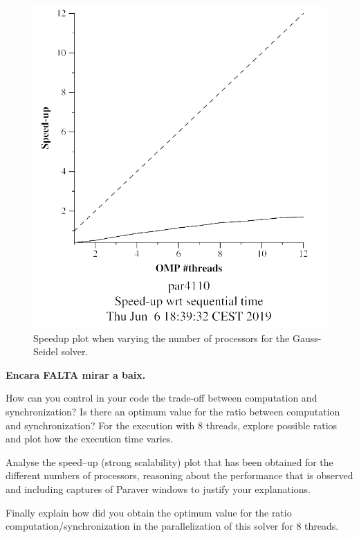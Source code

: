 \documentclass[12pt, a4paper]{article}
\begin{document}
\begin{figure}[H]
\begin{minipage}{0.4\linewidth}
  \includegraphics[scale=0.5]{./images/heat-omp-strong-gauss-speedup}
  \caption{Speedup plot when varying the number of processors for the Gauss-Seidel solver.}
    \label{plot:speed-gauss}
\end{minipage}
\end{figure}

\textbf{\large{\large{Encara FALTA mirar a baix.}}}

\newpage

How can you control in your code the trade-off between computation and synchronization? Is there
an optimum value for the ratio between computation and synchronization? For the execution with
8 threads, explore possible ratios and plot how the execution time varies.

Analyse the speed–up (strong scalability)
plot that has been obtained for the different numbers of processors, reasoning about the performance
that is observed and including captures of Paraver windows to justify your explanations. 






Finally explain
how did you obtain the optimum value for the ratio computation/synchronization in the parallelization
of this solver for 8 threads.
\end{document}
